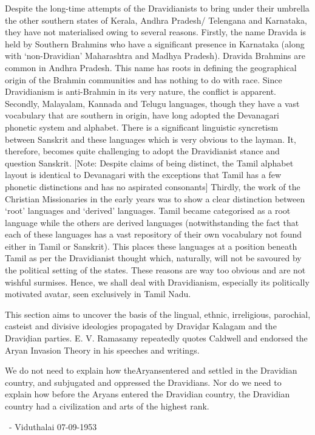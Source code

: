 Despite the long-time attempts of the Dravidianists to bring under their umbrella the other southern states of Kerala, Andhra Pradesh/ Telengana and Karnataka, they have not materialised owing to several reasons. Firstly, the name Dravida is held by Southern Brahmins who have a significant presence in Karnataka (along with ‘non-Dravidian’ Maharashtra and Madhya Pradesh). Dravida Brahmins are common in Andhra Pradesh. This name has roots in defining the geographical origin of the Brahmin communities and has nothing to do with race. Since Dravidianism is anti-Brahmin in its very nature, the conflict is apparent. Secondly, Malayalam, Kannada and Telugu languages, though they have a vast vocabulary that are southern in origin, have long adopted the Devanagari phonetic system and alphabet. There is a significant linguistic syncretism between Sanskrit and these languages which is very obvious to the layman. It, therefore, becomes quite challenging to adopt the Dravidianist stance and question Sanskrit. [Note: Despite claims of being distinct, the Tamil alphabet layout is identical to Devanagari with the exceptions that Tamil has a few phonetic distinctions and has no aspirated consonants] Thirdly, the work of the Christian Missionaries in the early years was to show a clear distinction between ‘root’ languages and ‘derived’ languages. Tamil became categorised as a root language while the others are derived languages (notwithstanding the fact that each of these languages has a vast repository of their own vocabulary not found either in Tamil or Sanskrit). This places these languages at a position beneath Tamil as per the Dravidianist thought which, naturally, will not be savoured by the political setting of the states. These reasons are way too obvious and are not wishful surmises. Hence, we shall deal with Dravidianism, especially its politically motivated avatar, seen exclusively in Tamil Nadu.

This section aims to uncover the basis of the lingual, ethnic, irreligious, parochial, casteist and divisive ideologies propagated by Draviḍar Kalagam and the Draviḍian parties. E. V. Ramasamy repeatedly quotes Caldwell and endorsed the Aryan Invasion Theory in his speeches and writings.

\begin{myquote}
We do not need to explain how theAryansentered and settled in the Dravidian country, and subjugated and oppressed the Dravidians. Nor do we need to explain how before the Aryans entered the Dravidian country, the Dravidian country had a civilization and arts of the highest rank.

~\hfill - Viduthalai 07-09-1953
\end{myquote}


